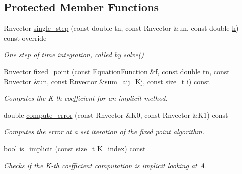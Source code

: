 \subsection*{Protected Member Functions}
\begin{DoxyCompactItemize}
\item 
Rnvector \hyperlink{classRKSolver_a12a097a860de0ed2647344661133ba90}{single\+\_\+step} (const double tn, const Rnvector \&un, const double \hyperlink{classBaseSolver_a6dbedd1610b0979379e6acbb0a4093cd}{h}) const override
\begin{DoxyCompactList}\small\item\em One step of time integration, called by \hyperlink{classRKSolver_aa251eaaa56b4ef39d95347579b8a6259}{solve()} \end{DoxyCompactList}\item 
Rnvector \hyperlink{classRKSolver_abb7c57c57c820ab981eab492ad9511db}{fixed\+\_\+point} (const \hyperlink{structEquationFunction}{Equation\+Function} \&f, const double tn, const Rnvector \&un, const Rnvector \&sum\+\_\+aij\+\_\+\+Kj, const size\+\_\+t i) const
\begin{DoxyCompactList}\small\item\em Computes the K-\/th coefficient for an implicit method. \end{DoxyCompactList}\item 
double \hyperlink{classRKSolver_a0d3892f1b340e82c8aa135441f5adbed}{compute\+\_\+error} (const Rnvector \&K0, const Rnvector \&K1) const
\begin{DoxyCompactList}\small\item\em Computes the error at a set iteration of the fixed point algorithm. \end{DoxyCompactList}\item 
bool \hyperlink{classRKSolver_a3362f4ffb68c9fc3fc1dd1bdf36233fa}{is\+\_\+implicit} (const size\+\_\+t K\+\_\+index) const
\begin{DoxyCompactList}\small\item\em Checks if the K-\/th coefficient computation is implicit looking at A. \end{DoxyCompactList}\end{DoxyCompactItemize}
